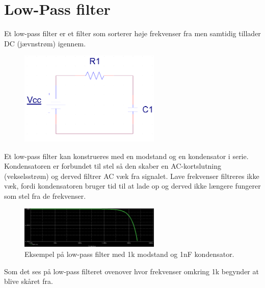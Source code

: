 \section{Low-Pass filter}

Et low-pass filter er et filter som sorterer høje frekvenser fra men samtidig tillader DC (jævnstrøm) igennem.

\begin{figure}[h!]
  \centering
  \includegraphics[width=0.6\textwidth]{figures/low_pass_schematic.png}
\end{figure}

Et low-pass filter kan konstrueres med en modstand og en kondensator i serie. Kondensatoren er forbundet til stel så den skaber en AC-kortslutning (vekselsstrøm) og derved filtrer AC væk fra signalet. 
Lave frekvenser filtreres ikke væk, fordi kondensatoren bruger tid til at lade op og derved ikke længere fungerer som stel fra de frekvenser.

\begin{figure}[h!]
  \centering
  \includegraphics[width=0.6\textwidth]{figures/low_pass_cut_off_frequency.png}
  \caption{Eksempel på low-pass filter med 1k modstand og 1nF kondensator.}
\end{figure}
Som det ses på low-pass filteret ovenover hvor frekvenser omkring 1k begynder at blive skåret fra.

